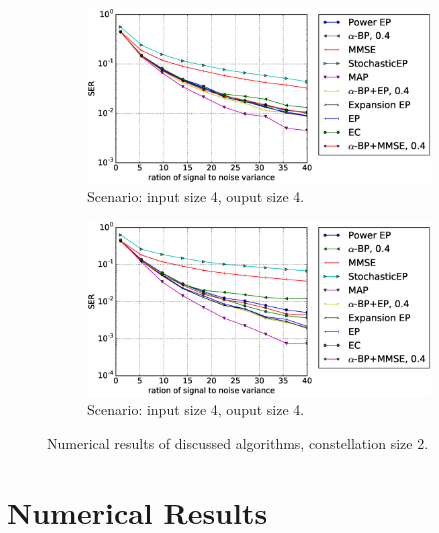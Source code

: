\documentclass{article}
\begin{document}
\begin{figure}[!t]
  \begin{subfigure}{1\textwidth}
    \includegraphics[width=1\linewidth]{figures/ep_experiments_4by4_bpsk_alpha4.eps}
    \caption{Scenario: input size 4, ouput size 4.}
    \label{fig:compare-const2-44}
  \end{subfigure}
  \begin{subfigure}{1\textwidth}
    \includegraphics[width=1\linewidth]{figures/ep_experiments8by8_bpsk_alpha4.eps}
    \caption{Scenario: input size 4, ouput size 4.}
    \label{fig:compare-const2-88}
  \end{subfigure}
  \caption{Numerical results of discussed algorithms, constellation size 2.}
  \label{fig:compare-const2}
\end{figure}
\section{Numerical Results}
\end{document}
